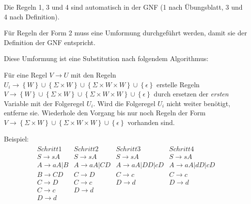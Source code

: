 \documentclass{article}
\begin{document}
Die Regeln 1, 3 und 4 sind automatisch in der GNF (1 nach Übungsblatt, 3 und 4 nach Definition).

Für Regeln der Form 2 muss eine Umformung durchgeführt werden, damit sie der Definition der GNF entspricht.

Diese Umformung ist eine Substitution nach folgendem Algorithmus:

Für eine Regel $V \rightarrow U$ mit den Regeln $U_i \rightarrow \left\{W\right\}\cup\left\{\Sigma\times W\right\}\cup\left\{\Sigma \times W \times W\right\}\cup\left\{\epsilon\right\}$ erstelle Regeln $V \rightarrow \left\{W\right\}\cup\left\{\Sigma\times W\right\}\cup\left\{\Sigma \times W \times W\right\}\cup\left\{\epsilon\right\}$ durch ersetzen der \textit{ersten} Variable mit der Folgeregel $U_i$. Wird die Folgeregel $U_i$ nicht weiter benötigt, entferne sie.
Wiederhole den Vorgang bis nur noch Regeln der Form $V \rightarrow \left\{\Sigma\times W\right\}\cup\left\{\Sigma \times W \times W\right\}\cup\left\{\epsilon\right\}$ vorhanden sind.

Beispiel:
\begin{align*}
\begin{array}{llll}
Schritt 1 & Schritt 2 & Schritt 3 & Schritt 4 \\
\hline
S \rightarrow sA     & S \rightarrow sA      & S \rightarrow sA & S \rightarrow sA\\
A \rightarrow aA | B & A \rightarrow aA | CD & A \rightarrow aA | DD | cD &A \rightarrow aA | dD | cD\\
B \rightarrow CD     & C \rightarrow D & C \rightarrow c &C \rightarrow c\\
C \rightarrow D      & C \rightarrow c & D \rightarrow d &D \rightarrow d\\
C \rightarrow c      & D \rightarrow d &&\\
D \rightarrow d      & & &\\
\end{array}
\end{align*}
\end{document}

